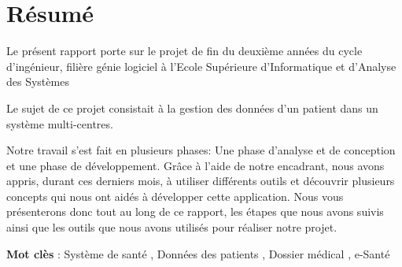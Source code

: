 \chapter*{Résumé}

Le présent rapport porte sur le projet de fin du deuxième années du cycle d'ingénieur, filière génie logiciel à l'Ecole Supérieure d'Informatique et d'Analyse des Systèmes 

Le sujet de ce projet consistait à la gestion des données d'un patient dans un système multi-centres.

 Notre travail s’est fait en plusieurs phases:
 Une phase d’analyse et de conception et une phase de développement.
 Grâce à l’aide de notre encadrant, nous avons appris, durant ces derniers mois, à utiliser
différents outils et découvrir plusieurs concepts qui nous ont aidés à développer cette application.
 Nous vous présenterons donc tout au long de ce rapport, les étapes que nous avons
suivis ainsi que les outils que nous avons utilisés pour réaliser notre projet.

\textbf{Mot clès} : Système de santé , Données des patients , Dossier médical , e-Santé 
